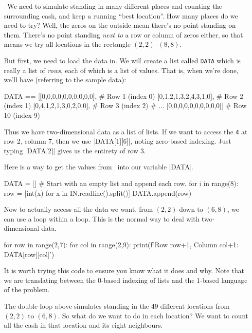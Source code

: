 \Scratch\ We need to simulate standing in many different places and counting the
surrounding cash, and keep a running ``best location''. How many places do we need to try?
Well, the zeros on the outside mean there's no point standing on them. There's no point
standing \emph{next to} a row or column of zeros either, so that means we try all
locations in the rectangle $(2,2)$--$(8,8)$.

But first, we need to load the data in. We will create a list called \texttt{DATA} which
is really a list of \emph{rows}, each of which is a list of values. That is, when we're
done, we'll have (referring to the sample data):

\begin{pythoncode}
  DATA == [[0,0,0,0,0,0,0,0,0,0],    # Row 1 (index 0)
           [0,1,2,1,3,2,4,3,1,0],    # Row 2 (index 1)
           [0,4,1,2,1,3,0,2,0,0],    # Row 3 (index 2)
           # ...
           [0,0,0,0,0,0,0,0,0,0]]    # Row 10 (index 9)
\end{pythoncode}

Thus we have two-dimensional data as a list of lists. If we want to access the \texttt{4}
at row 2, column 7, then we use \pycode|DATA[1][6]|, noting zero-based indexing. Just
typing \pycode|DATA[2]| gives us the entirety of row 3.

Here is a way to get the values from \IN\ into our variable \pycode|DATA|.

\begin{pythoncode}
  DATA = []                # Start with an empty list and append each row.
  for i in range(8):
    row = [int(x) for x in IN.readline().split()]
    DATA.append(row)
\end{pythoncode}

Now to actually access all the data we want, from $(2,2)$ down to $(6,8)$, we can use a
loop within a loop. This is the normal way to deal with two-dimensional data.

\begin{pythoncode}
  for row in range(2,7):
    for col in range(2,9):
      print(f'Row {row+1}, Column {col+1}: {DATA[row][col]}')
\end{pythoncode}

It is worth trying this code to ensure you know what it does and why. Note that we are
translating between the 0-based indexing of lists and the 1-based language of the problem.

The double-loop above simulates standing in the 49 different locations from $(2,2)$ to
$(6,8)$. So what do we want to do in each location? We want to count all the cash in that
location and its eight neighbours.

